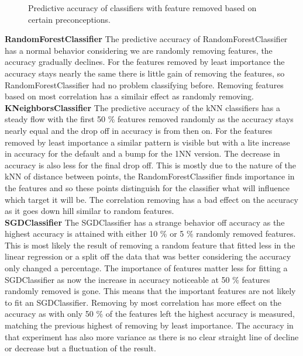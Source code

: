 \documentclass[a4paper,10pt]{article}
\begin{document}
\begin{figure}[H]
	\caption{Predictive accuracy of classifiers with feature removed based on certain preconceptions.}
	\label{fig:Rem}
\end{figure}

\textbf{RandomForestClassifier} The predictive accuracy of RandomForestClassifier has a normal behavior considering we are randomly removing features, the accuracy gradually declines. For the features removed by least importance the accuracy stays nearly the same there is little gain of removing the features, so RandomForestClassifier had no problem classifying before. Removing features based on most correlation has a similair effect as randomly removing. \\

\textbf{KNeighborsClassifier}  The predictive accuracy of the kNN classifiers has a steady flow with the first 50 $\%$ features removed randomly as the accuracy stays nearly equal and the drop off in accuracy is from then on. For the features removed by least importance a similar pattern is visible but with a lite increase in accuracy for the default and a bump for the 1NN version. The decrease in accuracy is also less for the final drop off. This is mostly due to the nature of the kNN of distance between points, the RandomForestClassifier finds importance in the features and so these points distinguish for the classifier what will influence which target it will be. The correlation removing has a bad effect on the accuracy as it goes down hill similar to random features.  \\

\textbf{SGDClassifier} The SGDClassifier has a strange behavior off accuracy as the highest accuracy is attained with either 10 $\%$ or 5 $\%$ randomly removed features. This is most likely the result of removing a random feature that fitted less in the linear regression or a split off the data that was better considering the accuracy only changed a percentage. The importance of features matter less for fitting a SGDClassifier as now the increase in accuracy noticeable at 50 $\%$ features randomly removed is gone. This means that the important features are not likely to fit an SGDClassifier. Removing by most correlation has more effect on the accuracy as with only 50 $\%$ of the features left the highest accuracy is measured, matching the previous highest of removing by least importance. The accuracy in that experiment has also more variance as there is no clear straight line of decline or decrease but a fluctuation of the result.   \\
\end{document}
